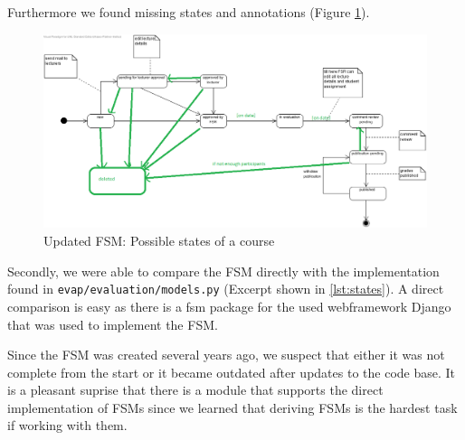 Furthermore we found missing states and annotations (Figure \ref{fig:new-states}).

\begin{figure}[h]
    \centering
    \includegraphics[width=\textwidth, keepaspectratio]{graphics/new_states_of_a_course}
    \caption{Updated FSM: Possible states of a course}
    \label{fig:new-states}
\end{figure}

Secondly, we were able to compare the FSM directly with the implementation found in \texttt{evap/evaluation/models.py} (Excerpt shown in \autoref{lst:states}).
A direct comparison is easy as there is a fsm package for the used webframework Django that was used to implement the FSM.



Since the FSM was created several years ago, we suspect that either it was not complete from the start or it became outdated after updates to the code base.  
It is a pleasant suprise that there is a module that supports the direct implementation of FSMs since we learned that deriving FSMs is the hardest task if working with them.
